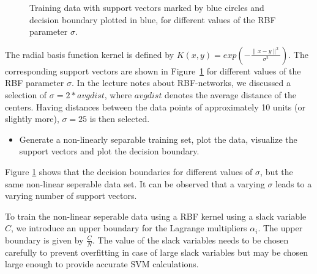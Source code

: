 \documentclass[a4]{article}
\begin{document}
\begin{figure}[h!]
\caption{Training data with support vectors marked by blue circles and decision boundary plotted in blue, for different values of the RBF parameter $\sigma$.}
\label{fig:sv_kernel}
\end{figure}
The radial basis function kernel is defined by $K(x,y) = exp(-\frac{\|x-y\|^2}{\sigma^2})$.
The corresponding support vectors are shown in Figure~\ref{fig:sv_kernel} for different values of the RBF parameter $\sigma$. In the lecture notes about RBF-networks, we discussed a selection of $\sigma= 2*avgdist$, where $avgdist$ denotes the average distance of the centers. Having distances between the data points of approximately 10 units (or slightly more), $\sigma= 25$ is then selected.

\begin{itemize}
\item Generate a non-linearly separable training set, plot the data, visualize the support vectors and plot the decision boundary.
\end{itemize}
Figure \ref{fig:sv_kernel} shows that the decision boundaries for different values of $\sigma$, but the same non-linear seperable data set. It can be observed that a varying $\sigma$ leads to a varying number of support vectors.


To train the non-linear seperable data using a RBF kernel using a slack variable $C$, we introduce an upper boundary for the Lagrange multipliers $\alpha _i$. The upper boundary is given by $\frac{C}{N}$. The value of the slack variables needs to be chosen carefully to prevent overfitting in case of large slack variables but may be chosen large enough to provide accurate SVM calculations.

% 
% 
\end{document}
